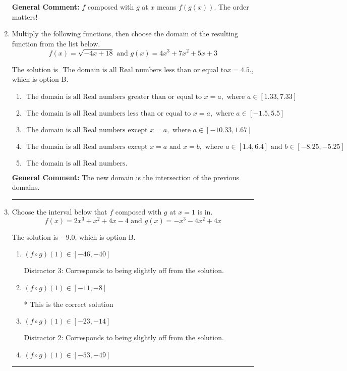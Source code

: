 \documentclass{extbook}[14pt]
\newcommand{\litem}[1]{\item #1

\rule{\textwidth}{0.4pt}}
\begin{document}
\begin{enumerate}
{\textbf{General Comment:} $f$ composed with $g$ at $x$ means $f(g(x))$. The order matters!
}
\litem{
Multiply the following functions, then choose the domain of the resulting function from the list below.
\[ f(x) = \sqrt{-4x+18}  \text{ and } g(x) = 4x^{3} +7 x^{2} +5 x + 3 \]

The solution is \( \text{ The domain is all Real numbers less than or equal to} x = 4.5. \), which is option B.\begin{enumerate}[label=\Alph*.]
\item \( \text{ The domain is all Real numbers greater than or equal to } x = a, \text{ where } a \in [1.33, 7.33] \)


\item \( \text{ The domain is all Real numbers less than or equal to } x = a, \text{ where } a \in [-1.5, 5.5] \)


\item \( \text{ The domain is all Real numbers except } x = a, \text{ where } a \in [-10.33, 1.67] \)


\item \( \text{ The domain is all Real numbers except } x = a \text{ and } x = b, \text{ where } a \in [1.4, 6.4] \text{ and } b \in [-8.25, -5.25] \)


\item \( \text{ The domain is all Real numbers. } \)


\end{enumerate}

\textbf{General Comment:} The new domain is the intersection of the previous domains.
}
\litem{
Choose the interval below that $f$ composed with $g$ at $x=1$ is in.
\[ f(x) = 2x^{3} + x^{2} +4 x -4 \text{ and } g(x) = -x^{3} -4 x^{2} +4 x \]

The solution is \( -9.0 \), which is option B.\begin{enumerate}[label=\Alph*.]
\item \( (f \circ g)(1) \in [-46, -40] \)

 Distractor 3: Corresponds to being slightly off from the solution.
\item \( (f \circ g)(1) \in [-11, -8] \)

* This is the correct solution
\item \( (f \circ g)(1) \in [-23, -14] \)

 Distractor 2: Corresponds to being slightly off from the solution.
\item \( (f \circ g)(1) \in [-53, -49] \)


\end{enumerate}}
\end{enumerate}
\end{document}
